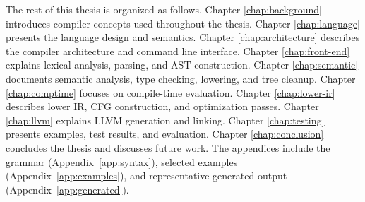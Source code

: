 The rest of this thesis is organized as follows. Chapter
\ref{chap:background} introduces compiler concepts used throughout the thesis.
Chapter \ref{chap:language} presents the \epl{} language design and semantics.
Chapter \ref{chap:architecture} describes the compiler architecture and command
line interface. Chapter \ref{chap:front-end} explains lexical analysis, parsing,
and AST construction. Chapter \ref{chap:semantic} documents semantic analysis,
type checking, \irtree{} lowering, and tree cleanup. Chapter
\ref{chap:comptime} focuses on compile-time evaluation. Chapter
\ref{chap:lower-ir} describes lower IR, CFG construction, and optimization
passes. Chapter \ref{chap:llvm} explains LLVM generation and linking. Chapter
\ref{chap:testing} presents examples, test results, and evaluation. Chapter
\ref{chap:conclusion} concludes the thesis and discusses future work. The
appendices include the grammar (Appendix~\ref{app:syntax}), selected examples
(Appendix~\ref{app:examples}), and representative generated output
(Appendix~\ref{app:generated}).
